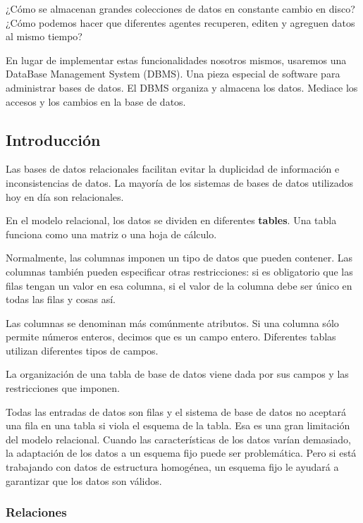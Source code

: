 \documentclass[12pt, fleqn]{article}                             %
\begin{document}
    ¿Cómo se almacenan grandes colecciones de datos en constante cambio en disco?
    ¿Cómo podemos hacer que diferentes agentes recuperen, editen y agreguen datos al mismo tiempo?

    En lugar de implementar estas funcionalidades nosotros mismos, usaremos una
    DataBase Management System (DBMS).
    Una pieza especial de software para administrar bases de datos.
    El DBMS organiza y almacena los datos. Mediace los accesos y los cambios en la base de datos.



    \subsection{Introducción}

        Las bases de datos relacionales facilitan evitar la duplicidad de información
        e inconsistencias de datos.
        La mayoría de los sistemas de bases de datos utilizados hoy en día son relacionales.

        En el modelo relacional, los datos se dividen en diferentes \textbf{tables}.
        Una tabla funciona como una matriz o una hoja de cálculo.

        Normalmente, las columnas imponen un tipo de datos que pueden contener.
        Las columnas también pueden especificar otras restricciones: si es obligatorio que las
        filas tengan un valor en esa columna, si el valor de la columna debe ser único en todas
        las filas y cosas así.

        Las columnas se denominan más comúnmente atributos.
        Si una columna sólo permite números enteros, decimos que es un campo entero.
        Diferentes tablas utilizan diferentes tipos de campos.

        La organización de una tabla de base de datos viene dada por sus campos y las
        restricciones que imponen.

        Todas las entradas de datos son filas y el sistema de base de datos no aceptará
        una fila en una tabla si viola el esquema de la tabla. Esa es una gran limitación
        del modelo relacional.
        Cuando las características de los datos varían demasiado, la adaptación de los datos
        a un esquema fijo puede ser problemática. Pero si está trabajando con datos de
        estructura homogénea, un esquema fijo le ayudará a garantizar que los datos son válidos.

        \clearpage
        \subsubsection{Relaciones}
\end{document}
